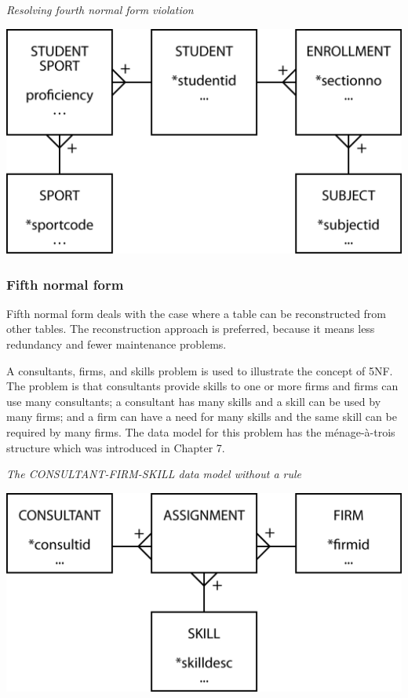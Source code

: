 \documentclass[
]{article}
\begin{document}
\emph{Resolving fourth normal form violation}

\includegraphics[width=6.25in,height=\textheight]{Figures/Chapter 8/4NF.png}

\hypertarget{fifth-normal-form}{%
\subsubsection*{Fifth normal form}\label{fifth-normal-form}}

Fifth normal form deals with the case where a table can be reconstructed
from other tables. The reconstruction approach is preferred, because it
means less redundancy and fewer maintenance problems.

A consultants, firms, and skills problem is used to illustrate the
concept of 5NF. The problem is that consultants provide skills to one or
more firms and firms can use many consultants; a consultant has many
skills and a skill can be used by many firms; and a firm can have a need
for many skills and the same skill can be required by many firms. The
data model for this problem has the ménage-à-trois structure which was
introduced in Chapter 7.

\emph{The CONSULTANT-FIRM-SKILL data model without a rule}

\includegraphics[width=6.25in,height=\textheight]{Figures/Chapter 8/5NF-1.png}
\end{document}

